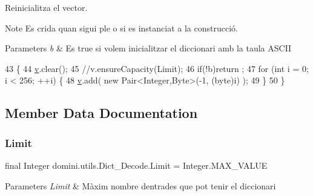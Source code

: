 Reinicialitza el vector. 

\begin{DoxyNote}{Note}
Es crida quan sigui ple o si es instanciat a la construcció. 
\end{DoxyNote}

\begin{DoxyParams}{Parameters}
{\em b} & Es true si volem inicialitzar el diccionari amb la taula A\+S\+C\+II \\
\hline
\end{DoxyParams}

\begin{DoxyCode}
43                                             \{
44         \hyperlink{classdomini_1_1utils_1_1Dict__Decode_a351bb8836b391e5e21ebc9cc1943a22d}{v}.clear();
45         \textcolor{comment}{//v.ensureCapacity(Limit);}
46         \textcolor{keywordflow}{if}(!b)return ;
47         \textcolor{keywordflow}{for} (\textcolor{keywordtype}{int} i = 0; i < 256; ++i) \{
48             \hyperlink{classdomini_1_1utils_1_1Dict__Decode_a351bb8836b391e5e21ebc9cc1943a22d}{v}.add( \textcolor{keyword}{new} Pair<Integer,Byte>(-1, (byte)i) );
49         \}
50     \}
\end{DoxyCode}


\subsection{Member Data Documentation}
\mbox{\label{classdomini_1_1utils_1_1Dict__Decode_a10fd6693de70b9091942496b35324c5a}} 
\subsubsection{\texorpdfstring{Limit}{Limit}}
{\footnotesize\ttfamily final Integer domini.\+utils.\+Dict\+\_\+\+Decode.\+Limit = Integer.\+M\+A\+X\+\_\+\+V\+A\+L\+UE\hspace{0.3cm}{\ttfamily [package]}}


\begin{DoxyParams}{Parameters}
{\em Limit} & Màxim nombre d\textquotesingle{}entrades que pot tenir el diccionari \\
\hline
\end{DoxyParams}
\mbox{\label{classdomini_1_1utils_1_1Dict__Decode_a351bb8836b391e5e21ebc9cc1943a22d}} 
